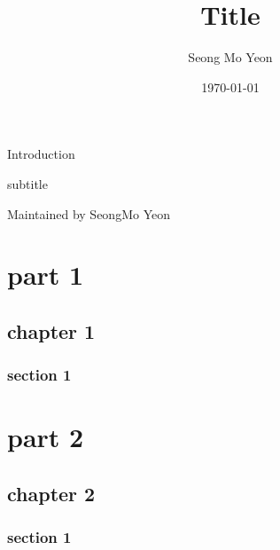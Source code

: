 \documentclass[twoside,chapter,openright]{xoblivoir}
\author{Seong Mo Yeon}
\date{\today}
\title{Title}
\begin{document}
\frontmatter

\begin{titlingpage}
\newcommand{\thesubtitle}{subtitle}

\vspace*{\fill}
\begin{center}
\HUGE\textsf{Introduction}\par
\end{center}
\vspace*{\fill}
\begin{center}
\Huge\textsf{\thesubtitle}\par
\end{center}
\begin{center}
\normalsize\textsf{Maintained by SeongMo Yeon}\par
\end{center}
\vspace*{\fill}

\end{titlingpage}

\tableofcontents

\mainmatter
\part{part 1}
\chapter{chapter 1}
\section{section 1}

\part{part 2}
\chapter{chapter 2}
\section{section 1}

\backmatter

% 
\end{document}
